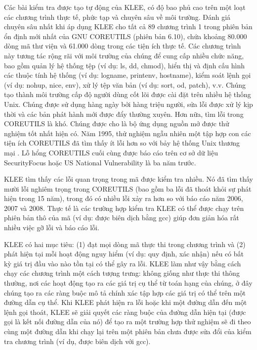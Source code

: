 \documentclass[12pt,a4paper]{article}
\begin{document}
\indent Các bài kiểm tra được tạo tự động của KLEE, có độ bao phủ cao trên một loạt các chương trình thực tế, phức tạp và chuyên sâu về môi trường. Đánh giá chuyên sâu nhất khi áp dụng KLEE cho tất cả 89 chương trình 1 trong phiên bản ổn định mới nhất của GNU COREUTILS (phiên bản 6.10), chứa khoảng 80.000 dòng mã thư viện và 61.000 dòng trong các tiện ích thực tế. Các chương trình này tương tác rộng rãi với môi trường của chúng để cung cấp nhiều chức năng, bao gồm quản lý hệ thống tệp (ví dụ: ls, dd, chmod), hiển thị và định cấu hình các thuộc tính hệ thống (ví dụ: logname, printenv, hostname), kiểm soát lệnh gọi (ví dụ: nohup, nice, env), xử lý tệp văn bản (ví dụ: sort, od, patch), v.v. Chúng tạo thành môi trường cấp độ người dùng cốt lõi được cài đặt trên nhiều hệ thống Unix. Chúng được sử dụng hàng ngày bởi hàng triệu người, sửa lỗi được xử lý kịp thời và các bản phát hành mới được đẩy thường xuyên. Hơn nữa, tìm lỗi trong COREUTILS là khó. Chúng được cho là bộ ứng dụng nguồn mở được thử nghiệm tốt nhất hiện có. Năm 1995, thử nghiệm ngẫu nhiên một tập hợp con các tiện ích COREUTILS đã tìm thấy ít lỗi hơn so với bảy hệ thống Unix thương mại \cite{miller2000re}. Lỗ hổng COREUTILS cuối cùng được báo cáo trên cơ sở dữ liệu SecurityFocus hoặc US National Vulnerability là ba năm trước.

\indent KLEE tìm thấy các lỗi quan trọng trong mã được kiểm tra nhiều. Nó đã tìm thấy mười lỗi nghiêm trọng trong COREUTILS (bao gồm ba lỗi đã thoát khỏi sự phát hiện trong 15 năm), trong đó có nhiều lỗi xảy ra hơn so với báo cáo năm 2006, 2007 và 2008. Thực tế là các trường hợp kiểm tra KLEE có thể được chạy trên phiên bản thô của mã (ví dụ: được biên dịch bằng gcc) giúp đơn giản hóa rất nhiều việc gỡ lỗi và báo cáo lỗi.

\indent KLEE có hai mục tiêu: (1) đạt mọi dòng mã thực thi trong chương trình và (2) phát hiện tại mỗi hoạt động nguy hiểm (ví dụ: quy định, xác nhận) nếu có bất kỳ giá trị đầu vào nào tồn tại có thể gây ra lỗi. KLEE làm như vậy bằng cách chạy các chương trình một cách tượng trưng: không giống như thực thi thông thường, nơi các hoạt động tạo ra các giá trị cụ thể từ toán hạng của chúng, ở đây chúng tạo ra các ràng buộc mô tả chính xác tập hợp các giá trị có thể trên một đường dẫn cụ thể. Khi KLEE phát hiện ra lỗi hoặc khi một đường dẫn đến một lệnh gọi thoát, KLEE sẽ giải quyết các ràng buộc của đường dẫn hiện tại (được gọi là kết nối đường dẫn của nó) để tạo ra một trường hợp thử nghiệm sẽ đi theo cùng một đường dẫn khi chạy lại trên một phiên bản chưa được sửa đổi của kiểm tra chương trình (ví dụ, được biên dịch với gcc).
\end{document}
